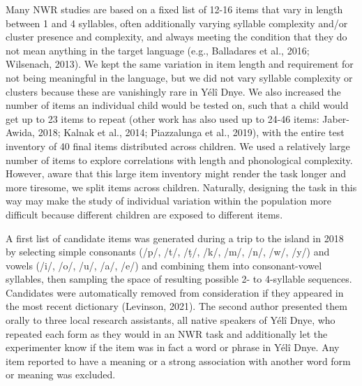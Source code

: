 \documentclass[
  american,
  ,man,floatsintext]{apa6}
\begin{document}
Many NWR studies are based on a fixed list of 12-16 items that vary in length between 1 and 4 syllables, often additionally varying syllable complexity and/or cluster presence and complexity, and always meeting the condition that they do not mean anything in the target language (e.g., Balladares et al., 2016; Wilsenach, 2013). We kept the same variation in item length and requirement for not being meaningful in the language, but we did not vary syllable complexity or clusters because these are vanishingly rare in Yélî Dnye. We also increased the number of items an individual child would be tested on, such that a child would get up to 23 items to repeat (other work has also used up to 24-46 items: Jaber-Awida, 2018; Kalnak et al., 2014; Piazzalunga et al., 2019), with the entire test inventory of 40 final items distributed across children. We used a relatively large number of items to explore correlations with length and phonological complexity. However, aware that this large item inventory might render the task longer and more tiresome, we split items across children. Naturally, designing the task in this way may make the study of individual variation within the population more difficult because different children are exposed to different items.

A first list of candidate items was generated during a trip to the island in 2018 by selecting simple consonants (/p/, /t/, /ṭ/, /k/, /m/, /n/, /w/, /y/) and vowels (/i/, /o/, /u/, /a/, /e/) and combining them into consonant-vowel syllables, then sampling the space of resulting possible 2- to 4-syllable sequences. Candidates were automatically removed from consideration if they appeared in the most recent dictionary (Levinson, 2021). The second author presented them orally to three local research assistants, all native speakers of Yélî Dnye, who repeated each form as they would in an NWR task and additionally let the experimenter know if the item was in fact a word or phrase in Yélî Dnye. Any item reported to have a meaning or a strong association with another word form or meaning was excluded.
\end{document}
